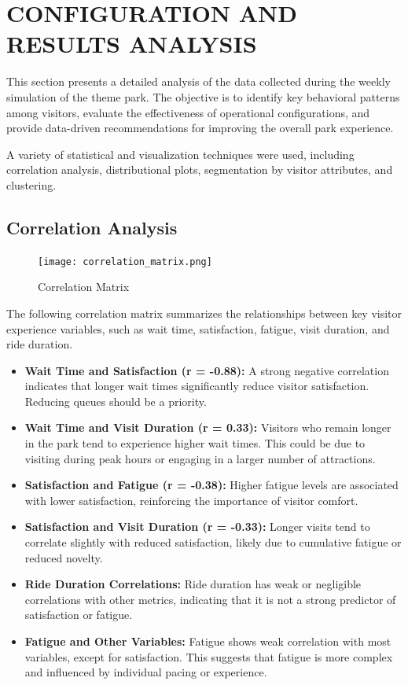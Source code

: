 \documentclass[12pt]{article}
\begin{document}
\section{CONFIGURATION AND RESULTS ANALYSIS}

This section presents a detailed analysis of the data collected during the weekly simulation of the theme park. The objective is to identify key behavioral patterns among visitors, evaluate the effectiveness of operational configurations, and provide data-driven recommendations for improving the overall park experience.

A variety of statistical and visualization techniques were used, including correlation analysis, distributional plots, segmentation by visitor attributes, and clustering.

\subsection{Correlation Analysis}

\begin{figure}[H]
    \centering
    \texttt{[image: correlation\_matrix.png]}
    \caption{Correlation Matrix}
    \label{fig:correlation-matrix}
\end{figure}

The following correlation matrix summarizes the relationships between key visitor experience variables, such as wait time, satisfaction, fatigue, visit duration, and ride duration.

\begin{itemize}
    \item \textbf{Wait Time and Satisfaction (r = -0.88):} A strong negative correlation indicates that longer wait times significantly reduce visitor satisfaction. Reducing queues should be a priority.
    \item \textbf{Wait Time and Visit Duration (r = 0.33):} Visitors who remain longer in the park tend to experience higher wait times. This could be due to visiting during peak hours or engaging in a larger number of attractions.
    \item \textbf{Satisfaction and Fatigue (r = -0.38):} Higher fatigue levels are associated with lower satisfaction, reinforcing the importance of visitor comfort.
    \item \textbf{Satisfaction and Visit Duration (r = -0.33):} Longer visits tend to correlate slightly with reduced satisfaction, likely due to cumulative fatigue or reduced novelty.
    \item \textbf{Ride Duration Correlations:} Ride duration has weak or negligible correlations with other metrics, indicating that it is not a strong predictor of satisfaction or fatigue.
    \item \textbf{Fatigue and Other Variables:} Fatigue shows weak correlation with most variables, except for satisfaction. This suggests that fatigue is more complex and influenced by individual pacing or experience.
\end{itemize}
\end{document}
